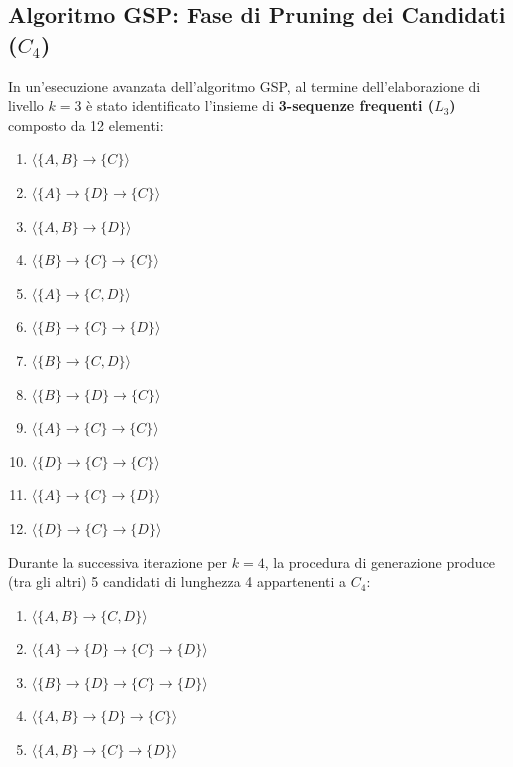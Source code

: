 \FloatBarrier
\subsection{Algoritmo GSP: Fase di Pruning dei Candidati (\texorpdfstring{$C_4$}{C4})}
\label{sec:dm-gsp-pruning-exercise}

In un'esecuzione avanzata dell'algoritmo GSP, al termine dell'elaborazione di livello $k=3$ è stato identificato l'insieme di \textbf{3-sequenze frequenti ($L_3$)} composto da 12 elementi:
\begin{enumerate}[label=\textbf{\arabic*.}]
    \item $\langle \{A, B\} \to \{C\} \rangle$
    \item $\langle \{A\} \to \{D\} \to \{C\} \rangle$
    \item $\langle \{A, B\} \to \{D\} \rangle$
    \item $\langle \{B\} \to \{C\} \to \{C\} \rangle$
    \item $\langle \{A\} \to \{C, D\} \rangle$
    \item $\langle \{B\} \to \{C\} \to \{D\} \rangle$
    \item $\langle \{B\} \to \{C, D\} \rangle$
    \item $\langle \{B\} \to \{D\} \to \{C\} \rangle$
    \item $\langle \{A\} \to \{C\} \to \{C\} \rangle$
    \item $\langle \{D\} \to \{C\} \to \{C\} \rangle$
    \item $\langle \{A\} \to \{C\} \to \{D\} \rangle$
    \item $\langle \{D\} \to \{C\} \to \{D\} \rangle$
\end{enumerate}

Durante la successiva iterazione per $k=4$, la procedura di generazione produce (tra gli altri) 5 candidati di lunghezza 4 appartenenti a $C_4$:
\begin{enumerate}[label=\textbf{C\arabic*.}]
    \item $\langle \{A, B\} \to \{C, D\} \rangle$
    \item $\langle \{A\} \to \{D\} \to \{C\} \to \{D\} \rangle$
    \item $\langle \{B\} \to \{D\} \to \{C\} \to \{D\} \rangle$
    \item $\langle \{A, B\} \to \{D\} \to \{C\} \rangle$
    \item $\langle \{A, B\} \to \{C\} \to \{D\} \rangle$
\end{enumerate}

